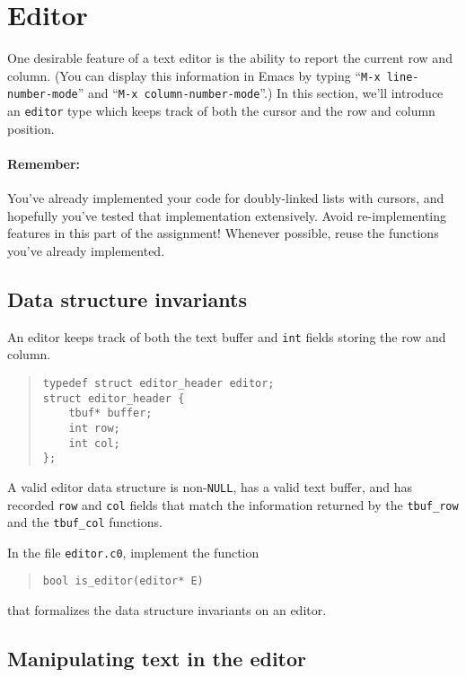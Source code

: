 \documentclass[12pt]{exam}
\begin{document}
\clearpage
\section{Editor}

One desirable feature of a text editor is the ability to report the
current row and column. (You can display this information in Emacs by
typing ``\lstinline'M-x line-number-mode''' and
``\lstinline'M-x column-number-mode'''.)
In this section, we'll introduce
an \lstinline'editor' type which keeps track of both the cursor and the row
and column position.

\paragraph{Remember:}

You've already implemented your code for doubly-linked lists with
cursors, and hopefully you've tested that implementation
extensively. Avoid re-implementing features in this part of the
assignment! Whenever possible, reuse the functions you've already
implemented.

\subsection{Data structure invariants}
An editor keeps track of both the text buffer and \lstinline'int'
fields storing the row and column.

\begin{quote}
\begin{lstlisting}
typedef struct editor_header editor;
struct editor_header {
    tbuf* buffer;
    int row;
    int col;
};
\end{lstlisting}
\end{quote}
A valid editor data structure is non-\lstinline'NULL', has a valid
text buffer, and has recorded \lstinline'row' and \lstinline'col'
fields that match the information returned by the \lstinline'tbuf_row'
and the \lstinline'tbuf_col' functions.

\begin{task}[3]
In the file \lstinline'editor.c0', implement the function
\begin{quote}
\lstinline'bool is_editor(editor* E)'
\end{quote}
\noindent that formalizes the data structure invariants on an editor.
\end{task}

\subsection{Manipulating text in the editor}
\end{document}
